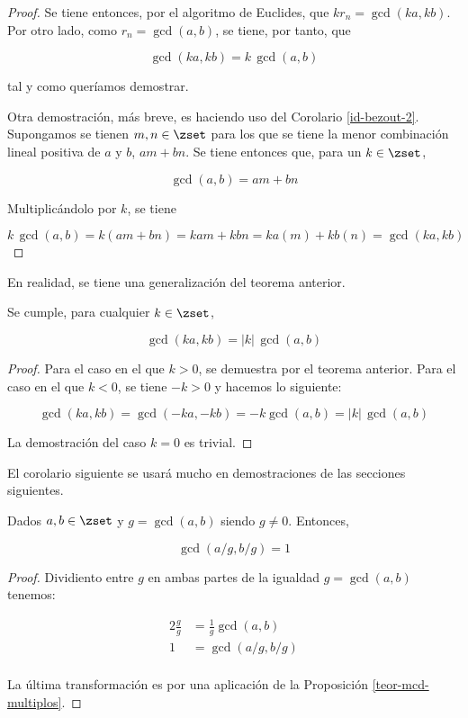 \begin{proof}
  \noindent Se tiene entonces, por el algoritmo de Euclides, que $kr_n =
  \gcd(ka, kb)$. Por otro lado, como $r_n = \gcd(a, b)$, se tiene, por
  tanto, que

  $$ \gcd(ka, kb) = k \, \gcd(a, b) $$

  \noindent tal y como queríamos demostrar.

  Otra demostración, más breve, es haciendo uso del Corolario
  \ref{id-bezout-2}. Supongamos se tienen $m, n \in \zset$ para los que se
  tiene la menor combinación lineal positiva de $a$ y $b$, $am + bn$. Se
  tiene entonces que, para un $k \in \zset$,

  $$ \gcd(a, b) = am + bn $$

  \noindent Multiplicándolo por $k$, se tiene

  $$ k \, \gcd(a, b) = k(am + bn) = kam + kbn = ka(m) + kb(n) = \gcd(ka, kb)
  $$
\end{proof}

En realidad, se tiene una generalización del teorema anterior.

\begin{corollary}
  Se cumple, para cualquier $k \in \zset$,

  $$ \gcd(ka, kb) = |k| \, \gcd(a, b) $$
\end{corollary}

\begin{proof}
  Para el caso en el que $k > 0$, se demuestra por el teorema anterior. Para
  el caso en el que $k < 0$, se tiene ${-k} > 0$ y hacemos lo siguiente:

  $$ \gcd(ka, kb) = \gcd({-ka}, {-kb}) = {-k} \gcd(a, b) = |k|
  \, \gcd(a, b)$$

  La demostración del caso $k = 0$ es trivial.
\end{proof}

El corolario siguiente se usará mucho en demostraciones de las secciones
siguientes.

\begin{corollary}\label{cor-mcd-div-mcd}
  Dados $a, b \in \zset$ y $g = \gcd(a, b)$ siendo $g \neq 0$. Entonces,

  $$ \gcd(a/g, b/g) = 1 $$
\end{corollary}


\begin{proof}
  Dividiento entre $g$ en ambas partes de la igualdad $g = \gcd(a, b)$
  tenemos:

  \begin{alignat*}{2}
    \frac{g}{g} &= \frac{1}{g}\gcd(a, b) \\
    1 &= \gcd(a/g, b/g) \\
  \end{alignat*}

\noindent La última transformación es por una aplicación de la Proposición
\ref{teor-mcd-multiplos}.
\end{proof}
